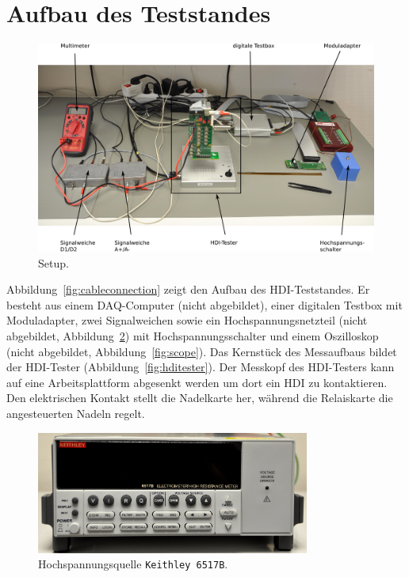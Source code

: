 \documentclass[a4paper,12pt,pointlessnumbers]{scrartcl}
\begin{document}
\section{Aufbau des Teststandes}
\begin{figure}
\centering
  \includegraphics[angle=90]{figures/setup_labled.png}
 \caption{Setup.}
 \label{fig:setup}
\end{figure}
Abbildung~\ref{fig:cableconnection} zeigt den Aufbau des HDI-Teststandes.
Er besteht aus einem DAQ-Computer (nicht abgebildet), einer digitalen Testbox mit Moduladapter, zwei Signalweichen sowie ein Hochspannungsnetzteil (nicht abgebildet, Abbildung~\ref{fig:sourcemeter}) mit Hochspannungsschalter und einem Oszilloskop (nicht abgebildet, Abbildung~\ref{fig:scope}).
Das Kernst{\"u}ck des Messaufbaus bildet der HDI-Tester (Abbildung~\ref{fig:hditester}).
Der Messkopf des HDI-Testers kann auf eine Arbeitsplattform abgesenkt werden um dort ein HDI zu kontaktieren.
Den elektrischen Kontakt stellt die Nadelkarte her, w{\"a}hrend die Relaiskarte die angesteuerten Nadeln regelt.
\begin{figure}
\centering
  \includegraphics[width=0.8\textwidth]{figures/sourcemeter.jpg}
 \caption{Hochspannungsquelle \texttt{Keithley 6517B}.}
 \label{fig:sourcemeter}
\end{figure}
\end{document}
